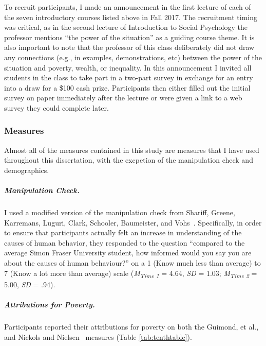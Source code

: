 \documentclass{sfuthesis}
\begin{document}
To recruit participants, I made an announcement in the first lecture of each of the seven introductory courses listed above in Fall 2017. The recruitment timing was critical, as in the second lecture of Introduction to Social Psychology the professor mentions “the power of the situation” as a guiding course theme. It is also important to note that the professor of this class deliberately did not draw any connections (e.g., in examples, demonstrations, etc) between the power of the situation and poverty, wealth, or inequality. In this announcement I invited all students in the class to take part in a two-part survey in exchange for an entry into a draw for a \$100 cash prize. Participants then either filled out the initial survey on paper immediately after the lecture or were given a link to a web survey they could complete later.

\subsubsection{Measures}

Almost all of the measures contained in this study are measures that I have used throughout this dissertation, with the excpetion of the manipulation check and demographics.

\subparagraph{Manipulation Check.} I used a modified version of the manipulation check from Shariff, Greene, Karremans, Luguri, Clark, Schooler, Baumeister, and Vohs~\cite{shariff14}. Specifically, in order to ensure that participants actually felt an increase in understanding of the causes of human behavior, they responded to the question “compared to the average Simon Fraser University student, how informed would you say you are about the causes of human behaviour?” on a 1 (Know much less than average) to 7 (Know a lot more than average) scale (\textit{M\textsubscript{Time 1}} = 4.64, \textit{SD} = 1.03; \textit{M\textsubscript{Time 2}} = 5.00, \textit{SD} = .94).

\subparagraph{Attributions for Poverty.} Participants reported their attributions for poverty on both the Guimond, et al.,~\cite{guimond89} and Nickols and Nielsen~\cite{nickols11} measures (Table \ref{tab:tenthtable}).
\end{document}
